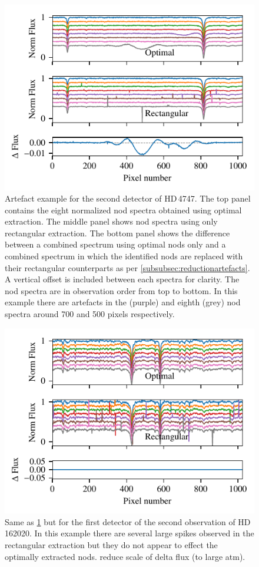  \begin{figure}
     \centering
     \includegraphics[width=0.7\linewidth]{figures/appendix/bp_plots/extraction_comparision_HD4747-1_chip_2}
     \caption{Artefact example for the second detector of {HD\,4747}.  The top panel contains the eight normalized nod spectra obtained using optimal extraction.
The middle panel shows nod spectra using only rectangular extraction.
The bottom panel shows the difference between a combined spectrum using optimal nods only and a combined spectrum in which the identified nods are replaced with their rectangular counterparts as per \cref{subsubsec:reductionartefacts}.
A vertical offset is included between each spectra for clarity.
The nod spectra are in observation order from top to bottom.
In this example there are artefacts in the  (purple) and eighth (grey) nod spectra around 700 and 500 pixels respectively.}
     \label{fig:artefact_example1}
 \end{figure}
 \begin{figure}
     \centering
     \includegraphics[width=0.7\linewidth]{figures/appendix/bp_plots/extraction_comparision_HD162020-2_chip_1}
     \caption{Same as \cref{fig:artefact_example1} but for the first detector of the second observation of {HD\,162020}.
In this example there are several large spikes observed in the rectangular extraction but they do not appear to effect the optimally extracted nods. {\red{} reduce scale of delta flux (to large atm)}.}
     \label{fig:artefact_example2}
 \end{figure}

